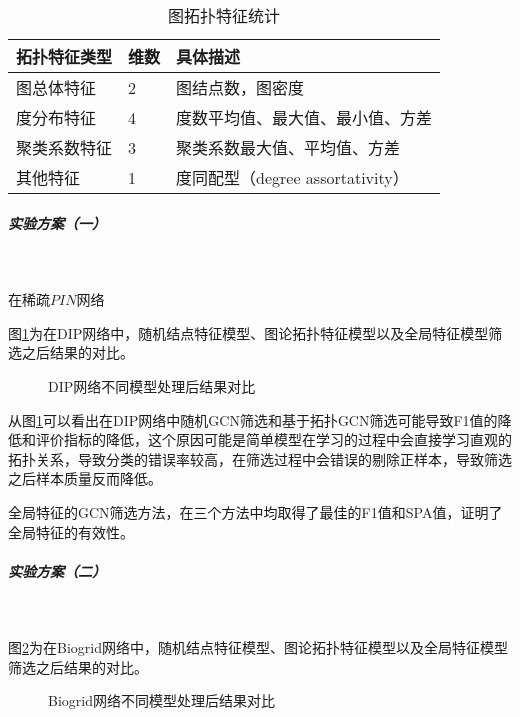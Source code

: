 {\begin{table}[h]
    \centering
    \caption{图拓扑特征统计}
    \label{tab:datasets:statisticgraphfeat}
    \begin{tabular}{C{3cm}C{2cm}L{8cm}}
        \toprule
        \textbf{拓扑特征类型} & \textbf{维数} & \textbf{具体描述}                \\
        \midrule
        图总体特征            & 2             & 图结点数，图密度                 \\
        度分布特征            & 4             & 度数平均值、最大值、最小值、方差 \\
        聚类系数特征          & 3             & 聚类系数最大值、平均值、方差     \\
        其他特征              & 1             & 度同配型（degree assortativity） \\
        \bottomrule
    \end{tabular}
\end{table}

\subparagraph*{实验方案（一）} ~

在稀疏$PIN$网络

图\ref{fig:result/DIP/node}为在DIP网络中，随机结点特征模型、图论拓扑特征模型以及全局特征模型筛选之后结果的对比。
\begin{figure}[htbp]
    \centering
    \vskip0.2cm
    \caption{DIP网络不同模型处理后结果对比}
    \label{fig:result/DIP/node}
\end{figure}
从图\ref{fig:result/DIP/node}可以看出在DIP网络中随机GCN筛选和基于拓扑GCN筛选可能导致F1值的降低和评价指标的降低，这个原因可能是简单模型在学习的过程中会直接学习直观的拓扑关系，导致分类的错误率较高，在筛选过程中会错误的剔除正样本，导致筛选之后样本质量反而降低。

全局特征的GCN筛选方法，在三个方法中均取得了最佳的F1值和SPA值，证明了全局特征的有效性。

\subparagraph*{实验方案（二）} ~

图\ref{fig:result/Biogrid/node}为在Biogrid网络中，随机结点特征模型、图论拓扑特征模型以及全局特征模型筛选之后结果的对比。
\begin{figure}[htbp]
    \centering
    \vskip0.2cm
    \caption{Biogrid网络不同模型处理后结果对比}
    \label{fig:result/Biogrid/node}
\end{figure}

}
